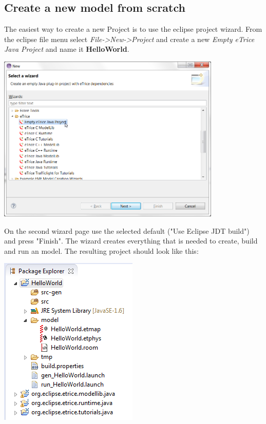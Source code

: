 




\subsection{Create a new model from scratch}

The easiest way to create a new \eTrice{} Project is to use the eclipse project wizard. From the eclipse file 
menu select \emph{File->New->Project} and create a new \emph{Empty eTrice Java Project} and name it \textbf{HelloWorld}.

\includegraphics[width=0.8\textwidth]{images/015-HelloWorld10.png}

On the second wizard page use the selected default ("Use Eclipse JDT build") and press "Finish".
The wizard creates everything that is needed to create, build and run an \eTrice{} model. The resulting 
project should look like this:

\includegraphics{images/015-HelloWorld11.png}

